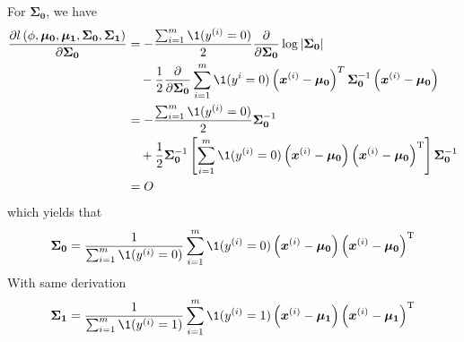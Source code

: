 \documentclass[a4paper]{article}
\begin{document}
\begin{enumerate}
For $\boldsymbol{\Sigma_{0}}$, we have
\begin{equation*}
\begin{aligned} 
  \frac{\partial l\left(\phi, \boldsymbol{\mu_{0}}, \boldsymbol{\mu_{1}}, \boldsymbol{\Sigma_{0}}, \boldsymbol{\Sigma_{1}}\right)}{\partial \boldsymbol{\Sigma_{0}}}
  &=-\frac{\sum_{i=1}^{m} \1 (y^{(i)}=0)}{2} \frac{\partial}{\partial \boldsymbol{\Sigma_{0}}} \log |\boldsymbol{\Sigma_{0}}|\\
  &\quad -\frac{1}{2} \frac{\partial}{\partial \boldsymbol{\Sigma_{0}}} \sum_{i=1}^{m}\1 (y^{i}=0) \left(\boldsymbol{x}^{(i)}-\boldsymbol{\mu_{0}}\right)^{T} \boldsymbol{\Sigma_{0}}^{-1}\left(\boldsymbol{x}^{(i)}-\boldsymbol{\mu_{0}}\right) \\ 
  &=-\frac{\sum_{i=1}^{m} \1 (y^{(i)}=0)}{2} \boldsymbol{\Sigma_{0}}^{-1}\\
  &\quad +\frac{1}{2} \boldsymbol{\Sigma_{0}}^{-1}\left[\sum_{i=1}^{m}\1 (y^{(i)}=0)\left(\boldsymbol{x}^{(i)}-\boldsymbol{\mu_{0}}\right)\left(\boldsymbol{x}^{(i)}-\boldsymbol{\mu_{0}}\right)^{\mathrm{T}}\right] \boldsymbol{\Sigma_{0}}^{-1} \\ 
  &=O 
\end{aligned}
\end{equation*}
which yields that
\begin{equation*}
  \boldsymbol{\Sigma_{0}} = \frac{1}{\sum_{i=1}^{m} \1 (y^{(i)}=0)} \sum_{i=1}^{m}\1 (y^{(i)}=0)\left(\boldsymbol{x}^{(i)}-\boldsymbol{\mu_{0}}\right)\left(\boldsymbol{x}^{(i)}-\boldsymbol{\mu_{0}}\right)^{\mathrm{T}}
\end{equation*}
With same derivation
\begin{equation*}
  \boldsymbol{\Sigma_{1}} = \frac{1}{\sum_{i=1}^{m} \1 (y^{(i)}=1)} \sum_{i=1}^{m}\1 (y^{(i)}=1)\left(\boldsymbol{x}^{(i)}-\boldsymbol{\mu_{1}}\right)\left(\boldsymbol{x}^{(i)}-\boldsymbol{\mu_{1}}\right)^{\mathrm{T}}
\end{equation*}



\end{enumerate}
\end{document}
